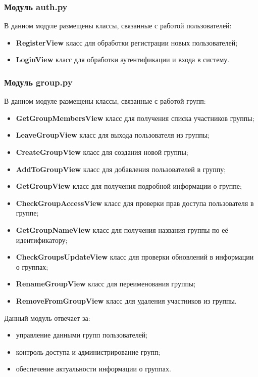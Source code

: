 \subsubsection{Модуль auth.py}
В данном модуле размещены классы, связанные с работой пользователей:
\begin{itemize}
	\item \textbf{RegisterView} класс для обработки регистрации новых пользователей;
	\item \textbf{LoginView} класс для обработки аутентификации и входа в систему.
\end{itemize}

\subsubsection{Модуль group.py}
В данном модуле размещены классы, связанные с работой групп:
\begin{itemize}
	\item \textbf{GetGroupMembersView} класс для получения списка участников группы;
	\item \textbf{LeaveGroupView} класс для выхода пользователя из группы;
	\item \textbf{CreateGroupView} класс для создания новой группы;
	\item \textbf{AddToGroupView} класс для добавления пользователей в группу;
	\item \textbf{GetGroupView} класс для получения подробной информации о группе;
	\item \textbf{CheckGroupAccessView} класс для проверки прав доступа пользователя в группе;
	\item \textbf{GetGroupNameView} класс для получения названия группы по её идентификатору;
	\item \textbf{CheckGroupsUpdateView} класс для проверки обновлений в информации о группах;
	\item \textbf{RenameGroupView} класс для переименования группы;
	\item \textbf{RemoveFromGroupView} класс для удаления участников из группы.
\end{itemize}
Данный модуль отвечает за:
\begin{itemize}
	\item управление данными групп пользователей;
	\item контроль доступа и администрирование групп;
	\item обеспечение актуальности информации о группах.
\end{itemize}


